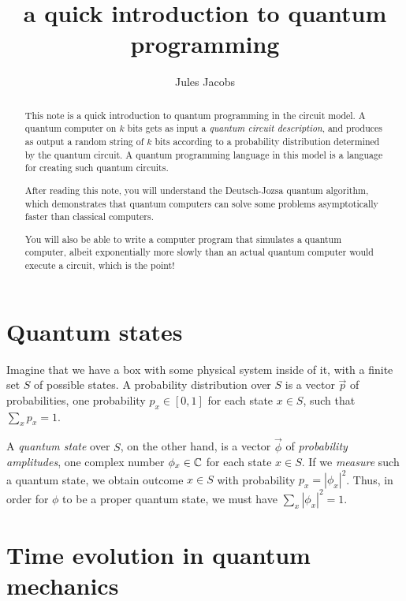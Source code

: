 
\usepackage{braket}
\usetikzlibrary{quantikz}

\title{a quick introduction to quantum programming}

\author{Jules Jacobs}


\maketitle

\begin{abstract}
  This note is a quick introduction to quantum programming in the circuit model.
  A quantum computer on $k$ bits gets as input a \emph{quantum circuit description},
  and produces as output a random string of $k$ bits according to a probability distribution determined by the quantum circuit.
  A quantum programming language in this model is a language for creating such quantum circuits.

  After reading this note, you will understand the Deutsch-Jozsa quantum algorithm,
  which demonstrates that quantum computers can solve some problems asymptotically faster than classical computers.
  
  You will also be able to write a computer program that simulates a quantum computer,
  albeit exponentially more slowly than an actual quantum computer would execute a circuit, which is the point!
\end{abstract}

\section{Quantum states}

Imagine that we have a box with some physical system inside of it, with a finite set $S$ of possible states.
A probability distribution over $S$ is a vector $\vec{p}$ of probabilities, one probability $p_x \in [0,1]$ for each state $x \in S$, such that $\sum_x p_x = 1$.

A \emph{quantum state} over $S$, on the other hand, is a vector $\vec{\phi}$ of \emph{probability amplitudes}, one complex number $\phi_x \in \mathbb{C}$ for each state $x \in S$.
If we \emph{measure} such a quantum state, we obtain outcome $x \in S$ with probability $p_x = |\phi_x|^2$.
Thus, in order for $\phi$ to be a proper quantum state, we must have $\sum_x |\phi_x|^2 = 1$.

\section{Time evolution in quantum mechanics}

